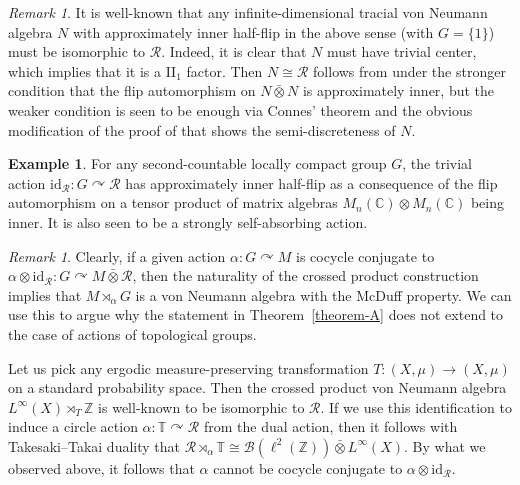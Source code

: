 \documentclass[11pt,a4paper]{article}
\theoremstyle{definition}
\newtheorem{example}[theorem]{Example}
\theoremstyle{remark}
\newtheorem{remark}[theorem]{Remark}
\numberwithin{equation}{section}
\numberwithin{theorem}{section}
\newcommand{\C}{\mathbb{C}}
\newcommand{\acts}{\curvearrowright}
\begin{document}
\begin{remark} \label{rem:ssa-misc}
It is well-known that any infinite-dimensional tracial von Neumann algebra $N$ with approximately inner half-flip in the above sense (with $G=\{1\}$) must be isomorphic to $\mathcal R$.
Indeed, it is clear that $N$ must have trivial center, which implies that it is a II$_1$ factor.
Then $N \cong \mathcal{R}$ follows from \cite[Theorem 5.1]{Connes76} under the stronger condition that the flip automorphism on $N\bar{\otimes} N$ is approximately inner, but the weaker condition is seen to be enough via Connes' theorem and the obvious modification of the proof of \cite[Proposition 2.8]{EffrosRosenberg78} that shows the semi-discreteness of $N$.
\end{remark}

\begin{example}\label{example:trivial_action_R}
For any second-countable locally compact group $G$, the trivial action $\mathrm{id}_\mathcal{R}\colon G \acts \mathcal{R}$ has approximately inner half-flip as a consequence of the flip automorphism on a tensor product of matrix algebras $M_n(\C) \otimes M_n(\C)$ being inner. 
It is also seen to be a strongly self-absorbing action.
\end{example}

\begin{remark} \label{rem:compact-fails-A}
Clearly, if a given action $\alpha: G\curvearrowright M$ is cocycle conjugate to $\alpha\otimes\mathrm{id}_{\mathcal R}: G\curvearrowright M\bar{\otimes}\mathcal R$, then the naturality of the crossed product construction implies that $M\rtimes_\alpha G$ is a von Neumann algebra with the McDuff property.
We can use this to argue why the statement in Theorem~\ref{theorem-A} does not extend to the case of actions of topological groups.

Let us pick any ergodic measure-preserving transformation $T: (X,\mu)\to (X,\mu)$ on a standard probability space.
Then the crossed product von Neumann algebra $L^\infty(X)\rtimes_T\mathbb Z$ is well-known to be isomorphic to $\mathcal R$.
If we use this identification to induce a circle action $\alpha: \mathbb{T}\curvearrowright\mathcal R$ from the dual action, then it follows with Takesaki--Takai duality \cite[Chapter X, Theorem 2.3]{Takesaki03} that $\mathcal{R}\rtimes_\alpha\mathbb{T}\cong \mathcal{B}(\ell^2(\mathbb{Z}))\bar{\otimes} L^\infty(X)$.
By what we observed above, it follows that $\alpha$ cannot be cocycle conjugate to $\alpha\otimes\mathrm{id}_{\mathcal R}$.
\end{remark}
\end{document}
